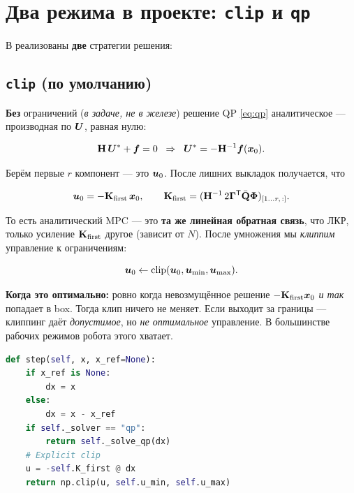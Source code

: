 \section{Два режима в проекте: \texttt{clip} и \texttt{qp}}

В  реализованы \textbf{две}
стратегии решения:

\subsection{\texttt{clip} (по умолчанию)}

\textbf{Без} ограничений (\emph{в задаче, не в железе}) решение QP
\eqref{eq:qp} аналитическое --- производная по $\bm{U}$, равная нулю:

\[
  \mathbf{H}\,\bm{U}^* + \bm{f} = 0
  \;\;\Rightarrow\;\;
  \bm{U}^* = -\mathbf{H}^{-1}\bm{f}(\bm{x}_0).
\]

Берём первые $r$ компонент --- это $\bm{u}_0$. После лишних выкладок
получается, что

\begin{equation}
  \bm{u}_0 = -\mathbf{K}_\text{first}\,\bm{x}_0,
  \qquad
  \mathbf{K}_\text{first} = (\mathbf{H}^{-1}\,2\mathbf{\Gamma}^{\mathsf{T}} \bar{\mathbf{Q}}\mathbf{\Phi})_{[1\ldots r,\,:]}.
  \label{eq:K_first}
\end{equation}

То есть аналитический MPC --- это \textbf{та же линейная обратная связь},
что ЛКР, только усиление $\mathbf{K}_\text{first}$ другое (зависит от $N$).
После умножения мы \emph{клиппим} управление к ограничениям:

\[
  \bm{u}_0 \leftarrow \operatorname{clip}(\bm{u}_0, \bm{u}_\text{min}, \bm{u}_\text{max}).
\]

\begin{notebox}
\textbf{Когда это оптимально:} ровно когда невозмущённое решение
$-\mathbf{K}_\text{first}\bm{x}_0$ \emph{и так} попадает в box. Тогда
клип ничего не меняет. Если выходит за границы --- клиппинг даёт
\emph{допустимое}, но \emph{не оптимальное} управление. В большинстве
рабочих режимов робота этого хватает.
\end{notebox}

\begin{codebox}[title={\filepath{mpc\_controller.py:288}}]
\begin{lstlisting}[language=Python]
def step(self, x, x_ref=None):
    if x_ref is None:
        dx = x
    else:
        dx = x - x_ref
    if self._solver == "qp":
        return self._solve_qp(dx)
    # Explicit clip
    u = -self.K_first @ dx
    return np.clip(u, self.u_min, self.u_max)
\end{lstlisting}
\end{codebox}

